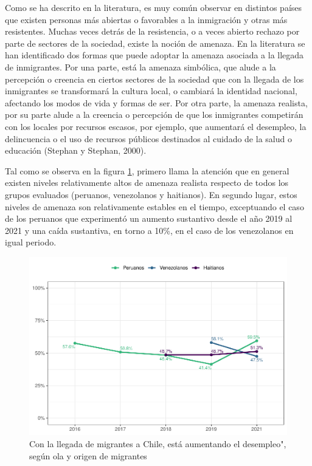 \documentclass[
  12pt,
]{book}
\begin{document}
Como se ha descrito en la literatura, es muy común observar en distintos países que existen personas más abiertas o favorables a la inmigración y otras más resistentes. Muchas veces detrás de la resistencia, o a veces abierto rechazo por parte de sectores de la sociedad, existe la noción de amenaza. En la literatura se han identificado dos formas que puede adoptar la amenaza asociada a la llegada de inmigrantes. Por una parte, está la amenaza simbólica, que alude a la percepción o creencia en ciertos sectores de la sociedad que con la llegada de los inmigrantes se transformará la cultura local, o cambiará la identidad nacional, afectando los modos de vida y formas de ser. Por otra parte, la amenaza realista, por su parte alude a la creencia o percepción de que los inmigrantes competirán con los locales por recursos escasos, por ejemplo, que aumentará el desempleo, la delincuencia o el uso de recursos públicos destinados al cuidado de la salud o educación (Stephan y Stephan, 2000).

Tal como se observa en la figura \ref{fig:amen1-wave}, primero llama la atención que en general existen niveles relativamente altos de amenaza realista respecto de todos los grupos evaluados (peruanos, venezolanos y haitianos). En segundo lugar, estos niveles de amenaza son relativamente estables en el tiempo, exceptuando el caso de los peruanos que experimentó un aumento sustantivo desde el año 2019 al 2021 y una caída sustantiva, en torno a 10\%, en el caso de los venezolanos en igual periodo.

\begin{figure}

{\centering \includegraphics{reporte-elsoc_files/figure-latex/amen1-wave-1} 

}

\caption{Con la llegada de migrantes a Chile, está aumentando el desempleo", según ola y origen de migrantes}\label{fig:amen1-wave}
\end{figure}
\end{document}
